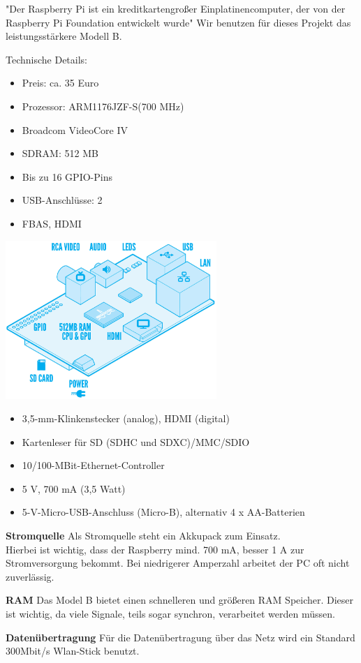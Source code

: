 \documentclass[12pt]{article}
\begin{document}
"Der Raspberry Pi ist ein kreditkartengroßer Einplatinencomputer, der von der Raspberry Pi Foundation entwickelt wurde" \cite{Pi}
Wir benutzen für dieses Projekt das leistungsstärkere Modell B.
\parbox{7,8cm}{
Technische Details: \cite{Amazon}
\begin{itemize}
\item Preis: ca. 35 Euro
\item Prozessor: ARM1176JZF-S(700 MHz)
\item Broadcom VideoCore IV
\item SDRAM: 512 MB
\item Bis zu 16 GPIO-Pins
\item USB-Anschlüsse: 2
\item FBAS, HDMI
\end{itemize}
}
\parbox{5cm}{
\includegraphics[width=8cm]{Raspi.jpg} \cite{Pipic}
}
\begin{itemize}
\item 3,5-mm-Klinkenstecker (analog), HDMI (digital)
\item Kartenleser für SD (SDHC und SDXC)/MMC/SDIO
\item 10/100-MBit-Ethernet-Controller 
\item 5 V, 700 mA (3,5 Watt)
\item 5-V-Micro-USB-Anschluss (Micro-B), alternativ 4 x AA-Batterien
\end{itemize}

{\bf Stromquelle} Als Stromquelle steht ein Akkupack zum Einsatz. \\
Hierbei ist wichtig, dass der Raspberry mind. 700 mA, besser 1 A zur Stromversorgung bekommt. 
Bei niedrigerer Amperzahl arbeitet der PC oft nicht zuverlässig.

{\bf RAM} Das Model B bietet einen schnelleren und größeren RAM Speicher. Dieser ist wichtig, da viele Signale, teils sogar synchron, verarbeitet werden müssen.

{\bf Datenübertragung} Für die Datenübertragung über das Netz wird ein Standard 300Mbit/s Wlan-Stick benutzt.
\end{document}
